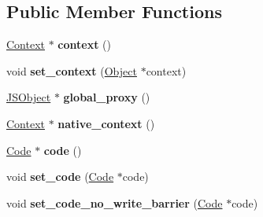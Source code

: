 \subsection*{Public Member Functions}
\begin{DoxyCompactItemize}
\item 
\hyperlink{classv8_1_1internal_1_1_context}{Context} $\ast$ {\bfseries context} ()\hypertarget{classv8_1_1internal_1_1_j_s_function_a058051825db659b76fc31531e444e3bc}{}\label{classv8_1_1internal_1_1_j_s_function_a058051825db659b76fc31531e444e3bc}

\item 
void {\bfseries set\+\_\+context} (\hyperlink{classv8_1_1internal_1_1_object}{Object} $\ast$context)\hypertarget{classv8_1_1internal_1_1_j_s_function_a3856d2e398406f970572c99fb30cbb1e}{}\label{classv8_1_1internal_1_1_j_s_function_a3856d2e398406f970572c99fb30cbb1e}

\item 
\hyperlink{classv8_1_1internal_1_1_j_s_object}{J\+S\+Object} $\ast$ {\bfseries global\+\_\+proxy} ()\hypertarget{classv8_1_1internal_1_1_j_s_function_a58af09e1d691648f3b81bd6b1f2fda75}{}\label{classv8_1_1internal_1_1_j_s_function_a58af09e1d691648f3b81bd6b1f2fda75}

\item 
\hyperlink{classv8_1_1internal_1_1_context}{Context} $\ast$ {\bfseries native\+\_\+context} ()\hypertarget{classv8_1_1internal_1_1_j_s_function_a649489453f646d811d952343c349e9c8}{}\label{classv8_1_1internal_1_1_j_s_function_a649489453f646d811d952343c349e9c8}

\item 
\hyperlink{classv8_1_1internal_1_1_code}{Code} $\ast$ {\bfseries code} ()\hypertarget{classv8_1_1internal_1_1_j_s_function_ad8b93c5dcdb6a0bf13b7d375ee0a7f70}{}\label{classv8_1_1internal_1_1_j_s_function_ad8b93c5dcdb6a0bf13b7d375ee0a7f70}

\item 
void {\bfseries set\+\_\+code} (\hyperlink{classv8_1_1internal_1_1_code}{Code} $\ast$code)\hypertarget{classv8_1_1internal_1_1_j_s_function_a12ae75a05a7b879043a2198a0a97a331}{}\label{classv8_1_1internal_1_1_j_s_function_a12ae75a05a7b879043a2198a0a97a331}

\item 
void {\bfseries set\+\_\+code\+\_\+no\+\_\+write\+\_\+barrier} (\hyperlink{classv8_1_1internal_1_1_code}{Code} $\ast$code)\hypertarget{classv8_1_1internal_1_1_j_s_function_a42dee37aa6d11138494cc13bc0742cbf}{}\label{classv8_1_1internal_1_1_j_s_function_a42dee37aa6d11138494cc13bc0742cbf}


\end{DoxyCompactItemize}
